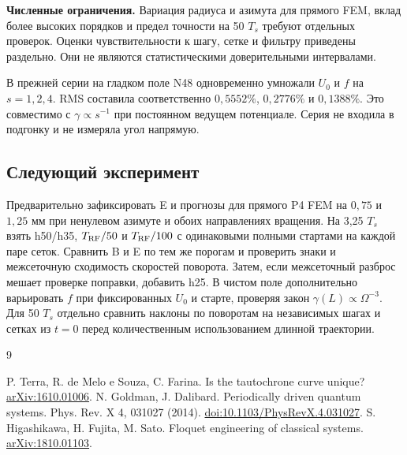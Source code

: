 \documentclass[11pt,a4paper]{article}
\begin{document}
\textbf{Численные ограничения.} Вариация радиуса и азимута для прямого
FEM, вклад более высоких порядков и предел точности на 50 $T_s$
требуют отдельных проверок. Оценки чувствительности к шагу,
сетке и фильтру приведены раздельно. Они не являются статистическими
доверительными интервалами.

В прежней серии на гладком поле N48 одновременно умножали $U_0$ и $f$
на $s=1,2,4$. RMS составила соответственно $0{,}5552\%$, $0{,}2776\%$
и $0{,}1388\%$.
Это совместимо с $\gamma\propto s^{-1}$ при постоянном ведущем
потенциале. Серия не входила в подгонку и не измеряла угол напрямую.

\subsection*{Следующий эксперимент}
Предварительно зафиксировать E и прогнозы для прямого P4 FEM на
$0{,}75$ и $1{,}25$ мм при ненулевом азимуте и обоих направлениях
вращения. На 3,25 $T_s$ взять h50/h35, $T_{\rm RF}/50$ и
$T_{\rm RF}/100$ с одинаковыми полными стартами на каждой паре сеток.
Сравнить B и E по тем же порогам и проверить знаки и
межсеточную сходимость скоростей поворота. Затем, если межсеточный
разброс мешает проверке поправки, добавить h25. В чистом поле
дополнительно варьировать $f$ при фиксированных $U_0$ и старте,
проверяя закон $\gamma(L)\propto\Omega^{-3}$. Для 50 $T_s$ отдельно
сравнить наклоны по поворотам на независимых шагах и сетках
из $t=0$ перед количественным использованием длинной траектории.

\begin{thebibliography}{9}\small\raggedright
{} P. Terra, R. de Melo e Souza, C. Farina. Is the tautochrone curve unique?
\href{https://arxiv.org/abs/1610.01006}{arXiv:1610.01006}.
 N. Goldman, J. Dalibard. Periodically driven quantum systems.
Phys. Rev. X 4, 031027 (2014).
\href{https://doi.org/10.1103/PhysRevX.4.031027}{doi:10.1103/PhysRevX.4.031027}.
 S. Higashikawa, H. Fujita, M. Sato. Floquet engineering
of classical systems. \href{https://arxiv.org/abs/1810.01103}{arXiv:1810.01103}.
\end{thebibliography}
\end{document}
